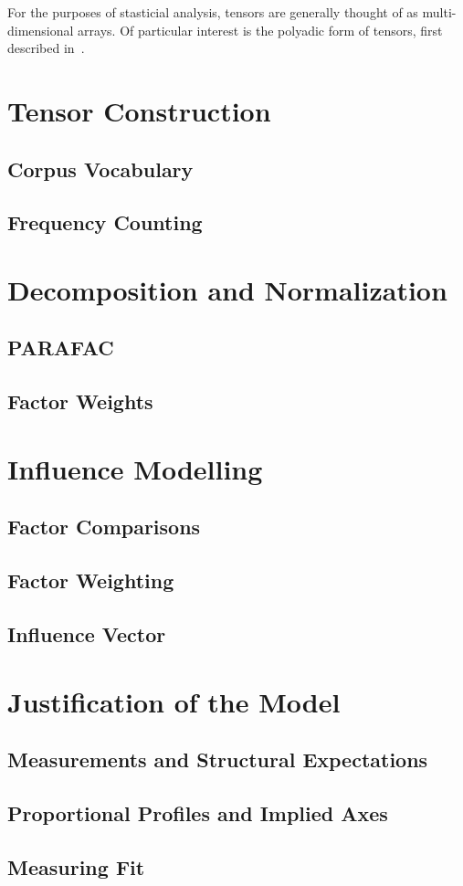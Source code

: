 \documentclass[../dissertation.tex]{subfiles}
\begin{document}
For the purposes of stasticial analysis, tensors are generally thought
of as multi-dimensional arrays. Of particular interest is the polyadic
form of tensors, first described in~\cite{hitchcock1927}. 
\section{Tensor Construction}
\subsection{Corpus Vocabulary}
\subsection{Frequency Counting}

\section{Decomposition and Normalization}
\subsection{PARAFAC}
\subsection{Factor Weights}

\section{Influence Modelling}
\subsection{Factor Comparisons}
\subsection{Factor Weighting}
\subsection{Influence Vector}

\section{Justification of the Model}
\subsection{Measurements and Structural Expectations}
\subsection{Proportional Profiles and Implied Axes}
\subsection{Measuring Fit}
\end{document}
